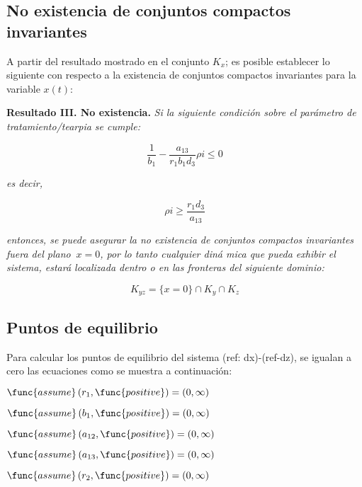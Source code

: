 \documentclass[letterpaper,11pt]{article}
\begin{document}
\subsection{No existencia de conjuntos compactos invariantes}

A partir del resultado mostrado en el conjunto $K_{x}$; es posible
establecer lo siguiente con respecto a la existencia de conjuntos compactos
invariantes para la variable $x\left( t\right) :$

\textbf{Resultado III. No existencia. }\textit{Si la siguiente condici\'{o}n
sobre el par\'{a}metro de tratamiento/tearpia se cumple:}

\begin{equation*}
\frac{1}{b_{1}}-\frac{a_{13}}{r_{1}b_{1}d_{3}}\rho i\leq 0
\end{equation*}

\textit{es decir,}

\begin{equation*}
\rho i\geq \frac{r_{1}d_{3}}{a_{13}}
\end{equation*}

\textit{entonces, se puede asegurar la no existencia de conjuntos compactos
invariantes fuera del plano }$\ x=0$\textit{, por lo tanto cualquier din\'{a}%
mica que pueda exhibir el sistema, estar\'{a} localizada dentro o en las
fronteras del siguiente dominio:}

\begin{equation*}
K_{yz}=\{x=0\}\cap K_{y}\cap K_{z}
\end{equation*}

\subsection{Puntos de equilibrio}

Para calcular los puntos de equilibrio del sistema (ref: dx)-(ref-dz), se
igualan a cero las ecuaciones como se muestra a continuaci\'{o}n:

$\func{assume}\left( r_{1},\func{positive}\right) =\allowbreak \left(
0,\infty \right) $

$\func{assume}\left( b_{1},\func{positive}\right) =\allowbreak \left(
0,\infty \right) $

$\func{assume}\left( a_{12},\func{positive}\right) =\allowbreak \left(
0,\infty \right) $

$\func{assume}\left( a_{13},\func{positive}\right) =\allowbreak \left(
0,\infty \right) $

$\func{assume}\left( r_{2},\func{positive}\right) =\allowbreak \left(
0,\infty \right) $
\end{document}
